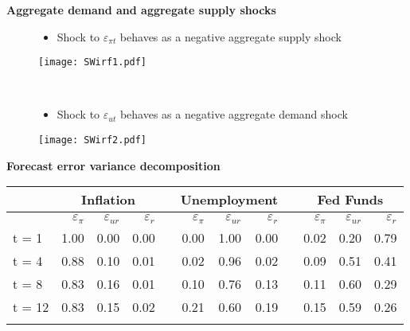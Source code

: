 \documentclass[10pt,handout]{beamer}
\begin{document}
\begin{frame}
{\textbf{Aggregate demand and aggregate supply shocks}}

\begin{minipage}{.48\textwidth}
\begin{figure}[h]
\begin{flushleft}
\small 
\begin{itemize}
\item Shock to $\varepsilon _{\pi t}$ behaves as a negative aggregate supply shock
\end{itemize}
\vspace{.3cm}
\texttt{[image: SWirf1.pdf]}
\end{flushleft}
\end{figure}
\end{minipage}\ \pause\ 
\begin{minipage}{.48\textwidth}
\begin{figure}[h]
\begin{flushleft}
\small 
\begin{itemize}
\item Shock to $\varepsilon _{u t}$ behaves as a negative aggregate demand shock
\end{itemize}
\vspace{.3cm}\texttt{[image: SWirf2.pdf]}
\end{flushleft}
\end{figure}
\end{minipage}
\end{frame}

\vspace{0.1cm}

\begin{frame}
{\textbf{Forecast error variance decomposition}}

\begin{table}[tbph]
{\small \centering%
\begin{tabular}{lrrrrrrrrrrr}
\addlinespace\toprule & \multicolumn{3}{c}{Inflation} &  & 
\multicolumn{3}{c}{Unemployment} &  & \multicolumn{3}{c}{Fed Funds} \\ 
\midrule & $\varepsilon _{\pi }$ & $\varepsilon _{ur}$ & $\varepsilon _{r}$
&  & $\varepsilon _{\pi }$ & $\varepsilon _{ur}$ & $\varepsilon _{r}$ &  & $%
\varepsilon _{\pi }$ & $\varepsilon _{ur}$ & $\varepsilon _{r}$ \\ 
\cline{2-4}\cline{6-8}\cline{10-12}
t = 1 & 1.00 & 0.00 & 0.00 &  & 0.00 & 1.00 & 0.00 &  & 0.02 & 0.20 & 0.79
\\ 
t = 4 & 0.88 & 0.10 & 0.01 &  & 0.02 & 0.96 & 0.02 &  & 0.09 & 0.51 & 0.41
\\ 
t = 8 & 0.83 & 0.16 & 0.01 &  & 0.10 & 0.76 & 0.13 &  & 0.11 & 0.60 & 0.29
\\ 
t = 12 & 0.83 & 0.15 & 0.02 &  & 0.21 & 0.60 & 0.19 &  & 0.15 & 0.59 & 0.26
\\ 
\bottomrule &  &  &  &  &  &  &  &  &  &  & 
\end{tabular}%
}
\end{table}
\end{frame}
\end{document}
